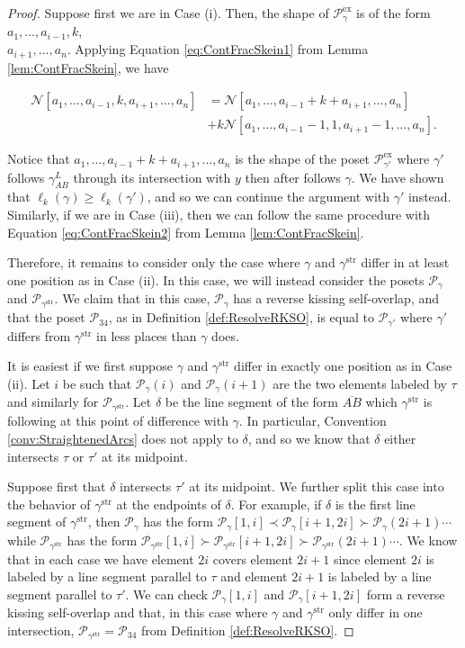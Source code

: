 \documentclass[12pt, letterpaper,table]{amsart}
\theoremstyle{remark}
\newcommand{\calP}{\mathcal{P}}
\newcommand{\stir}{\mathrm{str}}
\newcommand{\exx}{\mathrm{ex}}
\begin{document}
\begin{proof}
Suppose first we are in Case (i). Then, the shape of $\calP_\gamma^\exx$ is of the form $a_1,\ldots,a_{i-1},k$,\\$a_{i+1},\ldots,a_n$. Applying Equation \ref{eq:ContFracSkein1} from Lemma \ref{lem:ContFracSkein}, we have

\begin{align*}
\mathcal{N}[a_1,\ldots,a_{i-1},k,a_{i+1},\ldots,a_n] &= \mathcal{N}[a_1,\ldots,a_{i-1}+k+a_{i+1},\ldots,a_n]\\
&+ k\mathcal{N}[a_1,\ldots,a_{i-1}-1,1,a_{i+1}-1,\ldots,a_n].
\end{align*}


Notice that $a_1,\ldots,a_{i-1}+k+a_{i+1},\ldots,a_n$ is the shape of the poset $\calP^\exx_{\gamma'}$ where $\gamma'$ follows $\gamma_{AB}^L$ through its intersection with $y$ then after follows $\gamma$. We have shown that $\ell_k(\gamma) \geq \ell_k(\gamma')$, and so we can continue the argument with $\gamma'$ instead. Similarly, if we are in Case (iii), then we can follow the same procedure with  Equation \ref{eq:ContFracSkein2} from Lemma \ref{lem:ContFracSkein}.

Therefore, it remains to consider only the case where $\gamma$ and $\gamma^\stir$ differ in at least one position as in Case (ii). In this case, we will instead consider the posets $\calP_\gamma$ and $\calP_{\gamma^\stir}$. We claim that in this case, $\calP_{\gamma}$ has a reverse kissing self-overlap, and that the poset $\calP_{34}$, as in Definition \ref{def:ResolveRKSO}, is equal to $\calP_{\gamma'}$ where $\gamma'$ differs from $\gamma^\stir$ in less places than $\gamma$ does. 

It is easiest if we first suppose $\gamma$ and $\gamma^\stir$ differ in exactly one position as in Case (ii). Let $i$ be such that $\calP_\gamma(i)$ and $\calP_{\gamma}(i+1)$ are the two elements labeled by $\tau$ and similarly for $\calP_{\gamma^\stir}$. Let $\delta$ be the line segment of the form $\overline{AB}$ which $\gamma^\stir$ is following at this point of difference with $\gamma$. In particular, Convention \ref{conv:StraightenedArcs} does not apply to $\delta$, and so we know that $\delta$ either intersects $\tau$ or $\tau'$ at its midpoint. 

Suppose first that $\delta$ intersects $\tau'$ at its midpoint. We  further split this case into the behavior of $\gamma^\stir$ at the endpoints of $\delta$.  For example, if $\delta$ is the first line segment of $\gamma^\stir$,  then $\calP_\gamma$ has the form $\calP_\gamma[1,i] \prec \calP_\gamma[i+1,2i] \succ \calP_\gamma(2i+1) \cdots$ while $\calP_{\gamma^\stir}$ has the form $\calP_{\gamma^\stir}[1,i] \succ \calP_{\gamma^\stir}[i+1,2i] \succ \calP_{\gamma^\stir}(2i+1) \cdots$. 
We know that in each case we have element $2i$ covers element $2i+1$ since element $2i$ is labeled by a line segment parallel to $\tau$ and element $2i+1$  is labeled by a line segment parallel to $\tau'$. 
We can check $\calP_\gamma[1,i]$ and $\calP_\gamma[i+1,2i]$ form a reverse kissing self-overlap and that, in this case where $\gamma$ and $\gamma^\stir$ only differ in one intersection, $\calP_{\gamma^\stir} = \calP_{34}$ from Definition \ref{def:ResolveRKSO}. 


\end{proof}
\end{document}
